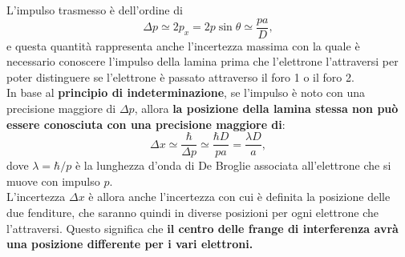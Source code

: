 L'impulso trasmesso è dell'ordine di
	\begin{equation}
		\boxed{
		\Delta p \simeq 2p_x = 2p \sin \theta \simeq \frac{pa}{D},
		}
	\end{equation}
e questa quantità rappresenta anche l'incertezza massima con la quale è necessario conoscere l'impulso della lamina prima che l'elettrone l'attraversi per poter distinguere se l'elettrone è passato attraverso il foro 1 o il foro 2.\\
In base al \textbf{principio di indeterminazione}, se l'impulso è noto con una precisione maggiore di $\Delta  p$, allora \textbf{la posizione della lamina stessa non può essere conosciuta con una precisione maggiore di}:
	\begin{equation}
		\boxed{
		\Delta x \simeq \frac{\hbar}{\Delta p} \simeq \frac{\hbar D}{pa}= \frac{\lambda D}{a},
		}
	\end{equation}
dove $\lambda = \hbar / p$ è la lunghezza d'onda di De Broglie associata all'elettrone che si muove con impulso $p$.\\

L'incertezza $\Delta x$ è allora anche l'incertezza con cui è definita la posizione delle due fenditure, che saranno quindi in diverse posizioni per ogni elettrone che l'attraversi. Questo significa che \textbf{il centro delle frange di interferenza avrà una posizione differente per i vari elettroni.}\\


